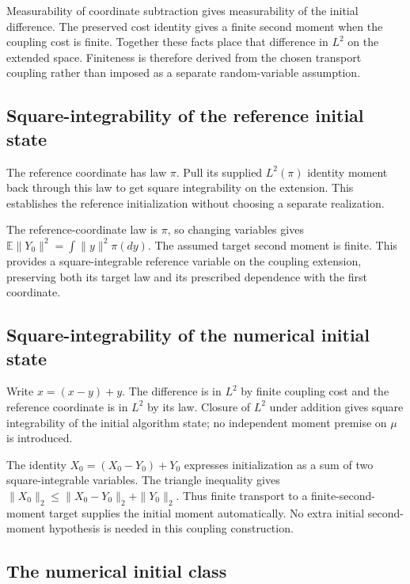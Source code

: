 \documentclass[11pt,a4paper]{article}
\begin{document}
Measurability of coordinate subtraction gives measurability of the initial difference. The preserved cost identity gives a finite second moment when the coupling cost is finite. Together these facts place that difference in \(L^2\) on the extended space. Finiteness is therefore derived from the chosen transport coupling rather than imposed as a separate random-variable assumption.


\subsection{\texorpdfstring{Square-integrability of the reference initial state}{Square-integrability of the reference initial state}}


The reference coordinate has law \(\pi\). Pull its supplied \(L^2(\pi)\) identity moment back through this law to get square integrability on the extension. This establishes the reference initialization without choosing a separate realization.



The reference-coordinate law is \(\pi\), so changing variables gives \(\mathbb E\|Y_0\|^2=\int\|y\|^2\pi(dy)\). The assumed target second moment is finite. This provides a square-integrable reference variable on the coupling extension, preserving both its target law and its prescribed dependence with the first coordinate.


\subsection{\texorpdfstring{Square-integrability of the numerical initial state}{Square-integrability of the numerical initial state}}


Write \(x=(x-y)+y\). The difference is in \(L^2\) by finite coupling cost and the reference coordinate is in \(L^2\) by its law. Closure of \(L^2\) under addition gives square integrability of the initial algorithm state; no independent moment premise on \(\mu\) is introduced.



The identity \(X_0=(X_0-Y_0)+Y_0\) expresses initialization as a sum of two square-integrable variables. The triangle inequality gives \(\|X_0\|_2\le\|X_0-Y_0\|_2+\|Y_0\|_2\). Thus finite transport to a finite-second-moment target supplies the initial moment automatically. No extra initial second-moment hypothesis is needed in this coupling construction.


\subsection{\texorpdfstring{The numerical initial class}{The numerical initial class}}
\end{document}
